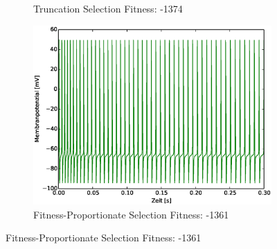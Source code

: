 \begin{frame}
\begin{figure}
\begin{subfigure}{.5\textwidth}
      \caption*{\scriptsize{Truncation Selection} \tiny{Fitness: -1374}}
    \end{subfigure}%
    \begin{subfigure}{.5\textwidth}
      \centering
      \includegraphics*[viewport=19 10 532 394,width=0.7\linewidth]{genetic/fs-fitn-prop.eps}
      \caption*{\scriptsize{Fitness-Proportionate Selection} \tiny{Fitness: -1361}}
    \end{subfigure}
  \end{figure}
\end{frame}


